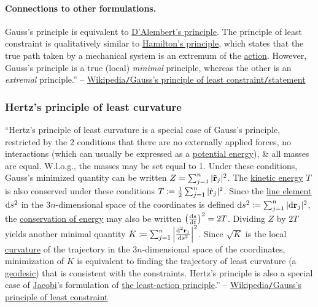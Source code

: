 \documentclass{article}
\begin{document}
\paragraph{Connections to other formulations.} Gauss's principle is equivalent to \href{https://en.wikipedia.org/wiki/D%27Alembert%27s_principle}{D'Alembert's principle}. The principle of least constraint is qualitatively similar to \href{https://en.wikipedia.org/wiki/Hamilton%27s_principle}{Hamilton's principle}, which states that the true path taken by a mechanical system is an extremum of the \href{https://en.wikipedia.org/wiki/Action_(physics)}{action}. However, Gauss's principle is a true (local) \textit{minimal} principle, whereas the other is an \textit{extremal} principle.'' -- \href{https://en.wikipedia.org/wiki/Gauss%27s_principle_of_least_constraint#Statement}{Wikipedia{\tt/}Gauss's principle of least constraint{\tt/}statement}

\subsubsection{Hertz's principle of least curvature}
``Hertz's principle of least curvature is a special case of Gauss's principle, restricted by the 2 conditions that there are no externally applied forces, no interactions (which can usually be expressed as a \href{https://en.wikipedia.org/wiki/Potential_energy}{potential energy}), \& all masses are equal. W.l.o.g., the masses may be set equal to 1. Under these conditions, Gauss's minimized quantity can be written $Z = \sum_{j=1}^n |\ddot{\bf r}_j|^2$. The \href{https://en.wikipedia.org/wiki/Kinetic_energy}{kinetic energy} $T$ is also conserved under these conditions $T\coloneqq\frac{1}{2}\sum_{j=1}^n |\dot{\bf r}_j|^2$. Since the \href{https://en.wikipedia.org/wiki/Line_element}{line element} ${\rm d}s^2$ in the $3n$-dimensional space of the coordinates is defined ${\rm d}s^2\coloneqq\sum_{j=1}^n |{\rm d}{\bf r}_j|^2$, the \href{https://en.wikipedia.org/wiki/Conservation_of_energy}{conservation of energy} may also be written $\left(\frac{{\rm d}s}{{\rm d}t}\right)^2 = 2T$. Dividing $Z$ by $2T$ yields another minimal quantity $K\coloneqq\sum_{j=1}^n \left|\frac{{\rm d}^2{\bf r}_j}{{\rm d}s^2}\right|^2$. Since $\sqrt{K}$ is the local \href{https://en.wikipedia.org/wiki/Curvature}{curvature} of the trajectory in the $3n$-dimensional space of the coordinates, minimization of $K$ is equivalent to finding the trajectory of least curvature (a \href{https://en.wikipedia.org/wiki/Geodesic}{geodesic}) that is consistent with the constraints. Hertz's principle is also a special case of \href{https://en.wikipedia.org/wiki/Carl_Gustav_Jakob_Jacobi}{Jacobi}'s formulation of \href{https://en.wikipedia.org/wiki/Maupertuis%27_principle}{the least-action principle}.'' -- \href{https://en.wikipedia.org/wiki/Gauss's_principle_of_least_constraint}{Wikipedia{\tt/}Gauss's principle of least constraint}
\end{document}

